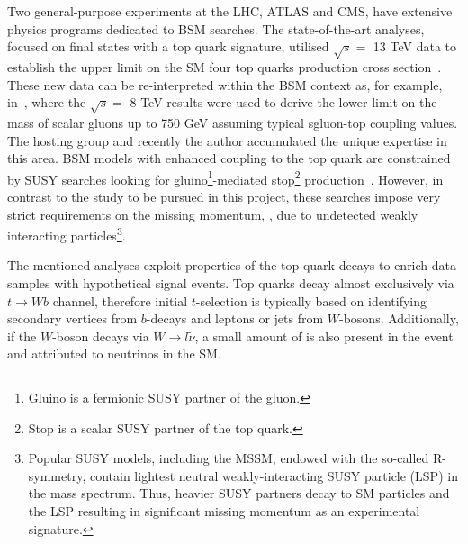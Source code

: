 Two general-purpose experiments at the LHC, ATLAS and CMS, have extensive physics programs dedicated to BSM searches. The state-of-the-art analyses, focused on final states with a top quark signature, utilised $\sqrt{s}=$ 13 TeV data to establish the upper limit on the SM four top quarks production cross section~\cite{ATLAS:2016gqb,CMS:2016wig,Beck:2016hyi}. These new data can be re-interpreted within the BSM context as, for example, in~\cite{Beck:2015cga}, where %
the $\sqrt{s}=$ 8 TeV results were used to derive the lower limit on the mass of scalar gluons up to 750 GeV assuming typical sgluon-top coupling values. The hosting group and recently the author accumulated the unique expertise in this area. BSM models with enhanced coupling to the top quark are constrained by SUSY searches looking for gluino\footnote{Gluino is a fermionic SUSY partner of the gluon.}-mediated stop\footnote{Stop is a scalar SUSY partner of the top quark.} production~\cite{CMS:2014dpa,Khachatryan:2016kod}. However, in contrast to the study to be pursued in this project, these searches impose very strict requirements on the missing momentum, \misspt, due to undetected weakly interacting particles\footnote{Popular SUSY models, including the MSSM, endowed with the so-called R-symmetry, contain lightest neutral weakly-interacting SUSY particle (LSP) in the mass spectrum. Thus, heavier SUSY partners decay to SM particles and the LSP resulting in significant missing momentum as an experimental signature.}.

The mentioned analyses exploit properties of the top-quark decays to enrich data samples with hypothetical signal events. Top quarks decay almost exclusively via $t \rightarrow Wb$ channel, therefore initial $t$-selection is typically based on identifying secondary vertices from $b$-decays and leptons or jets from $W$-bosons. Additionally, if the $W$-boson decays via $W\rightarrow l\tilde{\nu}$, a small amount of \misspt is also present in the event and attributed to neutrinos in the SM. 

